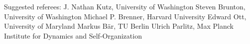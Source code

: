Suggested referees:
J. Nathan Kutz, University of Washington
Steven Brunton, University of Washington
Michael P. Brenner, Harvard University
Edward Ott, University of Maryland
Markus Bär, TU Berlin
Ulrich Parlitz, Max Planck Institute for Dynamics and Self-Organization